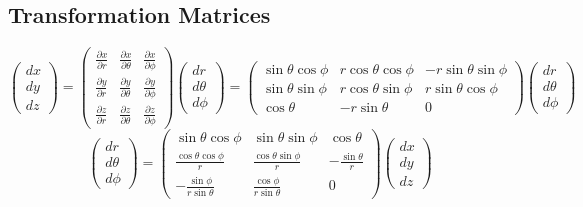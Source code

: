 \documentclass[10pt,letterpaper]{article}
\begin{document}
\subsection*{Transformation Matrices}
\begin{equation}
\renewcommand*{\arraystretch}{1.5}
\begin{pmatrix}
dx\\dy\\dz
\end{pmatrix}
=\begin{pmatrix}\frac{\partial x}{\partial r}&\frac{\partial x}{\partial \theta}&\frac{\partial x}{\partial \phi}\\ \frac{\partial y}{\partial r}&\frac{\partial y}{\partial \theta}&\frac{\partial y}{\partial \phi}\\
\frac{\partial z}{\partial r}&\frac{\partial z}{\partial \theta}&\frac{\partial z}{\partial \phi} \end{pmatrix}
\begin{pmatrix}dr\\d\theta\\d\phi\end{pmatrix}
= \begin{pmatrix}
\sin\theta\cos\phi&  r\cos\theta\cos\phi&-r\sin\theta\sin\phi\\
\sin\theta\sin\phi &r\cos\theta\sin\phi & r\sin\theta\cos\phi \\
\cos\theta&-r\sin\theta&0
\end{pmatrix}
\begin{pmatrix}dr\\d\theta\\d\phi\end{pmatrix}
\end{equation}
\begin{equation}
\renewcommand*{\arraystretch}{1.5}
\begin{pmatrix}dr\\d\theta\\d\phi\end{pmatrix}
=
\begin{pmatrix}
\sin\theta\cos\phi&\sin\theta\sin\phi&\cos\theta \\
\frac{\cos\theta\cos\phi}{r}&\frac{\cos\theta\sin\phi}{r}&-\frac{\sin\theta}{r}\\
-\frac{\sin\phi}{r\sin\theta}&\frac{\cos\phi}{r\sin\theta}&0
\end{pmatrix}
\begin{pmatrix}dx\\dy\\dz\end{pmatrix}
\end{equation}
\end{document}
